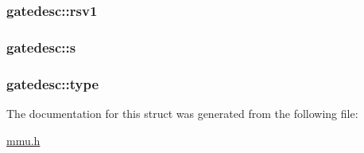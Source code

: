 \subsubsection[{\texorpdfstring{rsv1}{rsv1}}]{ gatedesc\+::rsv1}\hypertarget{structgatedesc_ad11779f5ce40e53a8feb3dfdaf3f0ee5}{}\label{structgatedesc_ad11779f5ce40e53a8feb3dfdaf3f0ee5}
\subsubsection[{\texorpdfstring{s}{s}}]{ gatedesc\+::s}\hypertarget{structgatedesc_a54d731df342be3a775cc847a3dab1a53}{}\label{structgatedesc_a54d731df342be3a775cc847a3dab1a53}
\subsubsection[{\texorpdfstring{type}{type}}]{ gatedesc\+::type}\hypertarget{structgatedesc_a41d6e5fb9bb27699bdb7d729c67ff32c}{}\label{structgatedesc_a41d6e5fb9bb27699bdb7d729c67ff32c}


The documentation for this struct was generated from the following file\+:\begin{DoxyCompactItemize}
\item 
\hyperlink{mmu_8h}{mmu.\+h}\end{DoxyCompactItemize}
